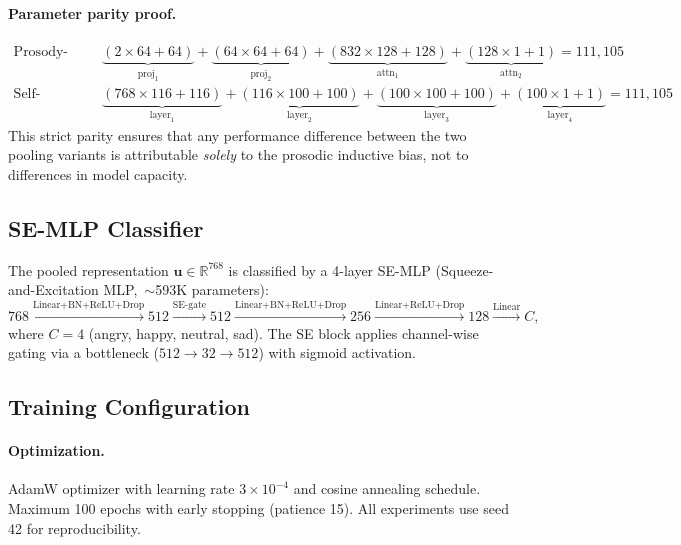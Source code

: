 \paragraph{Parameter parity proof.}
\begin{align}
\text{Prosody-Guided:} \quad & \underbrace{(2 \times 64 + 64)}_{\text{proj}_1} + \underbrace{(64 \times 64 + 64)}_{\text{proj}_2} + \underbrace{(832 \times 128 + 128)}_{\text{attn}_1} + \underbrace{(128 \times 1 + 1)}_{\text{attn}_2} = 111{,}105 \nonumber \\
\text{Self-Attention:} \quad & \underbrace{(768 \times 116 + 116)}_{\text{layer}_1} + \underbrace{(116 \times 100 + 100)}_{\text{layer}_2} + \underbrace{(100 \times 100 + 100)}_{\text{layer}_3} + \underbrace{(100 \times 1 + 1)}_{\text{layer}_4} = 111{,}105 \nonumber
\end{align}
This strict parity ensures that any performance difference between the two pooling variants is attributable \emph{solely} to the prosodic inductive bias, not to differences in model capacity.

\subsection{SE-MLP Classifier}
\label{ssec:classifier}

The pooled representation $\mathbf{u} \in \mathbb{R}^{768}$ is classified by a 4-layer SE-MLP (Squeeze-and-Excitation MLP,~${\sim}$593K parameters):
\begin{equation}
768 \xrightarrow{\text{Linear+BN+ReLU+Drop}} 512 \xrightarrow{\text{SE-gate}} 512 \xrightarrow{\text{Linear+BN+ReLU+Drop}} 256 \xrightarrow{\text{Linear+ReLU+Drop}} 128 \xrightarrow{\text{Linear}} C,
\end{equation}
where $C=4$ (angry, happy, neutral, sad).
The SE block applies channel-wise gating via a bottleneck ($512 \to 32 \to 512$) with sigmoid activation.

\subsection{Training Configuration}
\label{ssec:training}

\paragraph{Optimization.}
AdamW optimizer with learning rate $3 \times 10^{-4}$ and cosine annealing schedule.
Maximum 100 epochs with early stopping (patience 15).
All experiments use seed 42 for reproducibility.

